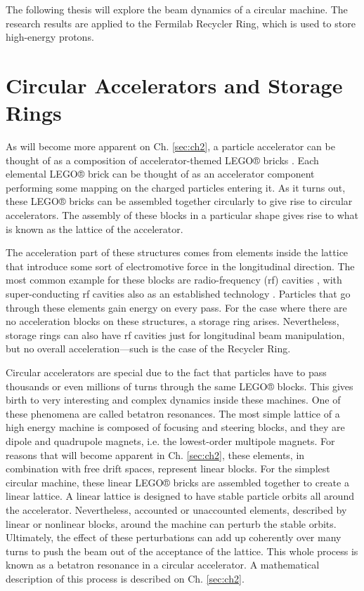 The following thesis will explore the beam dynamics of a circular machine. The research results are applied to the Fermilab Recycler Ring, which is used to store high-energy protons.

\section{Circular Accelerators and Storage Rings}

As will become more apparent on Ch. \ref{sec:ch2}, a particle accelerator can be thought of as a composition of accelerator-themed LEGO® bricks \cite{forest}. Each elemental LEGO® brick can be thought of as an accelerator component performing some mapping on the charged particles entering it. As it turns out, these LEGO® bricks can be assembled together circularly to give rise to circular accelerators. The assembly of these blocks in a particular shape gives rise to what is known as the lattice of the accelerator.

The acceleration part of these structures comes from elements inside the lattice that introduce some sort of electromotive force in the longitudinal direction. The most common example for these blocks are radio-frequency (rf) cavities \cite{sylee}, with super-conducting rf cavities also as an established technology \cite{srfcavs}. Particles that go through these elements gain energy on every pass. For the case where there are no acceleration blocks on these structures, a storage ring arises. Nevertheless, storage rings can also have rf cavities just for longitudinal beam manipulation, but no overall acceleration---such is the case of the Recycler Ring.    

Circular accelerators are special due to the fact that particles have to pass thousands or even millions of turns through the same LEGO® blocks. This gives birth to very interesting and complex dynamics inside these machines. One of these phenomena are called betatron resonances. The most simple lattice of a high energy machine is composed of focusing and steering blocks, and they are dipole and quadrupole magnets, i.e. the lowest-order multipole magnets. For reasons that will become apparent in Ch. \ref{sec:ch2}, these elements, in combination with free drift spaces, represent linear blocks. For the simplest circular machine, these linear LEGO® bricks are assembled together to create a linear lattice. A linear lattice is designed to have stable particle orbits all around the accelerator. Nevertheless, accounted or unaccounted elements, described by linear or nonlinear blocks, around the machine can perturb the stable orbits. Ultimately, the effect of these perturbations can add up coherently over many turns to push the beam out of the acceptance of the lattice. This whole process is known as a betatron resonance in a circular accelerator. A mathematical description of this process is described on Ch. \ref{sec:ch2}.

